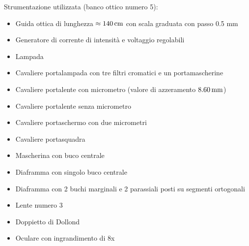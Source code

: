 Strumentazione utilizzata (banco ottico numero 5):
\begin{itemize}
\item Guida ottica di lunghezza $\approx 140 \,\mathrm{cm}$ con scala graduata con passo 0.5 mm
\item Generatore di corrente di intensità e voltaggio regolabili
\item Lampada 
\item Cavaliere portalampada con tre filtri cromatici e un portamascherine
\item Cavaliere portalente con micrometro (valore di azzeramento $8.60 \,\mathrm{mm}$)
\item Cavaliere portalente senza micrometro
\item Cavaliere portaschermo con due micrometri
\item Cavaliere portasquadra
\item Mascherina con buco centrale
\item Diaframma con singolo buco centrale
\item Diaframma con 2 buchi marginali e 2 parassiali posti su segmenti ortogonali
\item Lente numero 3
\item Doppietto di Dollond
\item Oculare con ingrandimento di 8x
\end{itemize}

